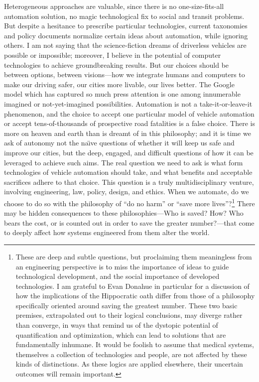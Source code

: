 Heterogeneous
approaches are valuable, since there is no one-size-fits-all
automation solution, no magic technological fix to social and transit
problems. But despite a hesitance to prescribe particular
technologies, current taxonomies and policy documents normalize
certain ideas about automation, while ignoring others. I am not saying that
the science-fiction dreams of 
driverless vehicles are possible or impossible; moreover, I believe in the
potential of computer technologies to achieve groundbreaking results.
But our choices should be between options, between
visions---how we integrate humans and computers to make our
driving safer, our cities more livable, our lives better. The Google model which has
captured so much press attention is one among innumerable imagined or
not-yet-imagined possibilities. Automation is not a
take-it-or-leave-it phenomenon, and the choice to accept one
particular model of vehicle automation or accept tens-of-thousands of
prospective road fatalities is a false choice. There is more on heaven
and earth than is dreamt of in this philosophy; and it is time we ask
of autonomy not the na\"{\i}ve questions of whether it will keep us
safe and improve our cities, but the deep, engaged, and difficult
questions of how it can be leveraged to achieve such aims. The real
question we need to ask is what form technologies of vehicle automation 
should take, and what benefits and acceptable sacrifices adhere to
that choice. This question is a truly multidisciplinary venture,
involving engineering, law, policy, design, and ethics. When we
automate, do we choose to do so with the philosophy of ``do no harm''
or ``save more lives''?\footnote{These are deep and subtle questions,
  but proclaiming them meaningless from an engineering perspective is
  to miss the importance of ideas to guide technological development,
  and the social importance of developed technologies. I am grateful
  to Evan Donahue in particular for a discussion of how the
  implications of the Hippocratic oath differ from those of a
  philosophy specifically oriented around saving the greatest number.
  These two basic premises, extrapolated out to their logical
  conclusions, may diverge rather than converge, in ways that remind
  us of the dystopic potential of quantification and optimization,
  which can lead to solutions that are fundamentally inhumane. It
  would be foolish 
  to assume that medical systems, themselves a collection of
  technologies and people, are not affected by these kinds of
  distinctions. As these logics are applied elsewhere, their uncertain
  outcomes
  will remain important.} There may be hidden consequences to these 
philosophies---Who is saved? How? Who bears the cost, or is
counted out in order to save the greater number?---that come to deeply
affect how systems engineered from them alter the world.



